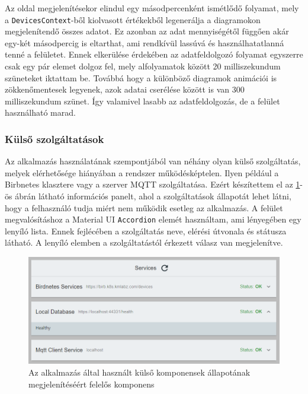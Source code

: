 Az oldal megjelenítésekor elindul egy másodpercenként ismétlődő folyamat,
mely a \verb+DevicesContext+-ből kiolvasott értékekből legenerálja a diagramokon megjelenítendő összes adatot.
Ez azonban az adat mennyiségétől függően akár egy-két másodpercig is eltarthat, ami rendkívül lassúvá és használhatatlanná tenné a felületet.
Ennek elkerülése érdekében az adatfeldolgozó folyamat egyszerre csak egy pár elemet dolgoz fel, mely alfolyamatok között 20 milliszekundum szüneteket iktattam be.
Továbbá hogy a különböző diagramok animációi is zökkenőmentesek legyenek, azok adatai cserélése között is van 300 milliszekundum szünet.
Így valamivel lasabb az adatfeldolgozás, de a felület használható marad.
\subsubsection{Külső szolgáltatások}
Az alkalmazás használatának szempontjából van néhány olyan külső szolgáltatás, melyek elérhetősége hiányában a rendszer működésképtelen.
Ilyen például a Birbnetes klasztere vagy a szerver MQTT szolgáltatása. 
Ezért készítettem el az \ref{fig:dashboard-services-loaded}-ös ábrán látható információs panelt, ahol a szolgáltatások állapotát lehet látni, hogy a felhasználó tudja miért nem működik esetleg az alkalmazás.
A felület megvalósításhoz a Material UI \verb+Accordion+ elemét használtam, ami lényegében egy lenyíló lista. 
Ennek fejlécében a szolgáltatás neve, elérési útvonala és státusza látható. A lenyíló elemben a szolgáltatástól érkezett válasz van megjelenítve. 

\begin{figure}[!ht]
    \centering
    \includegraphics[width=150mm, keepaspectratio]{figures/dashboard-services-loaded.png}
    \caption{Az alkalmazás által használt külső komponensek állapotának megjelenítéséért felelős komponens}
    \label{fig:dashboard-services-loaded}
\end{figure}

